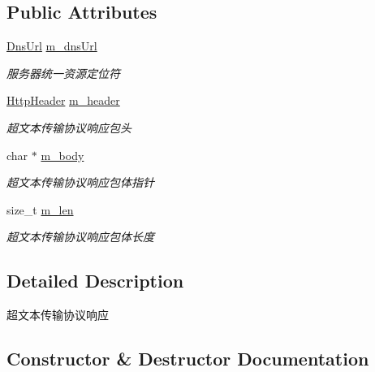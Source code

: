 \subsection*{Public Attributes}
\begin{DoxyCompactItemize}
\item 
\mbox{\label{class_http_response_a956ae19ba3b1c86ac6c6c2a5a07b5372}} 
\hyperlink{class_dns_url}{Dns\+Url} \hyperlink{class_http_response_a956ae19ba3b1c86ac6c6c2a5a07b5372}{m\+\_\+dns\+Url}
\begin{DoxyCompactList}\small\item\em 服务器统一资源定位符 \end{DoxyCompactList}\item 
\mbox{\label{class_http_response_a0ede873315f84c9af5cf94f3d3c9631f}} 
\hyperlink{class_http_header}{Http\+Header} \hyperlink{class_http_response_a0ede873315f84c9af5cf94f3d3c9631f}{m\+\_\+header}
\begin{DoxyCompactList}\small\item\em 超文本传输协议响应包头 \end{DoxyCompactList}\item 
\mbox{\label{class_http_response_a143e1bd466942aaa12a5b9b30c93bfab}} 
char $\ast$ \hyperlink{class_http_response_a143e1bd466942aaa12a5b9b30c93bfab}{m\+\_\+body}
\begin{DoxyCompactList}\small\item\em 超文本传输协议响应包体指针 \end{DoxyCompactList}\item 
\mbox{\label{class_http_response_af81c653a13929c449e99ee9c5e0cca3b}} 
size\+\_\+t \hyperlink{class_http_response_af81c653a13929c449e99ee9c5e0cca3b}{m\+\_\+len}
\begin{DoxyCompactList}\small\item\em 超文本传输协议响应包体长度 \end{DoxyCompactList}\end{DoxyCompactItemize}


\subsection{Detailed Description}
超文本传输协议响应 

\subsection{Constructor \& Destructor Documentation}
\mbox{\label{class_http_response_a85d8b6b97c7ca4334e2d37ad4425a7c2}} 
